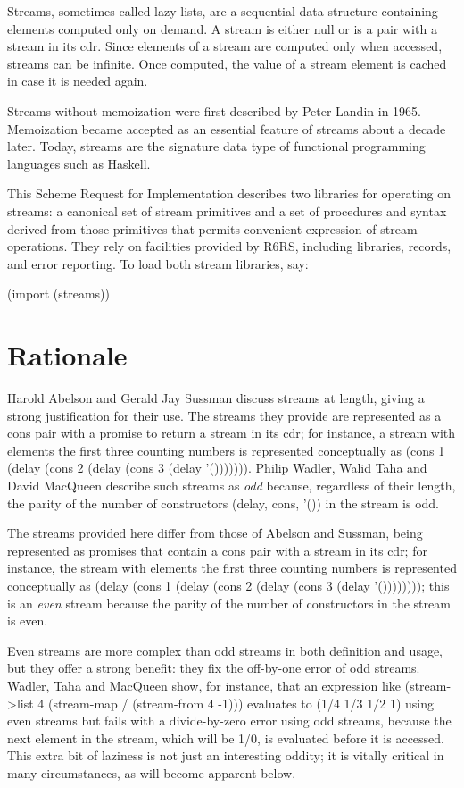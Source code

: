 Streams, sometimes called lazy lists, are a sequential data structure
containing elements computed only on demand. A stream is either null or
is a pair with a stream in its cdr. Since elements of a stream are
computed only when accessed, streams can be infinite. Once computed, the
value of a stream element is cached in case it is needed again.

Streams without memoization were first described by Peter Landin in
1965. Memoization became accepted as an essential feature of streams
about a decade later. Today, streams are the signature data type of
functional programming languages such as Haskell.

This Scheme Request for Implementation describes two libraries for
operating on streams: a canonical set of stream primitives and a set of
procedures and syntax derived from those primitives that permits
convenient expression of stream operations. They rely on facilities
provided by R6RS, including libraries, records, and error reporting. To
load both stream libraries, say:

(import (streams))

\section{Rationale}\label{rationale}

Harold Abelson and Gerald Jay Sussman discuss streams at length, giving
a strong justification for their use. The streams they provide are
represented as a cons pair with a promise to return a stream in its cdr;
for instance, a stream with elements the first three counting numbers is
represented conceptually as (cons 1 (delay (cons 2 (delay (cons 3 (delay
'())))))). Philip Wadler, Walid Taha and David MacQueen describe such
streams as \emph{odd} because, regardless of their length, the parity of
the number of constructors (delay, cons, '()) in the stream is odd.

The streams provided here differ from those of Abelson and Sussman,
being represented as promises that contain a cons pair with a stream in
its cdr; for instance, the stream with elements the first three counting
numbers is represented conceptually as (delay (cons 1 (delay (cons 2
(delay (cons 3 (delay '()))))))); this is an \emph{even} stream because
the parity of the number of constructors in the stream is even.

Even streams are more complex than odd streams in both definition and
usage, but they offer a strong benefit: they fix the off-by-one error of
odd streams. Wadler, Taha and MacQueen show, for instance, that an
expression like (stream-\textgreater{}list 4 (stream-map / (stream-from
4 -1))) evaluates to (1/4 1/3 1/2 1) using even streams but fails with a
divide-by-zero error using odd streams, because the next element in the
stream, which will be 1/0, is evaluated before it is accessed. This
extra bit of laziness is not just an interesting oddity; it is vitally
critical in many circumstances, as will become apparent below.

